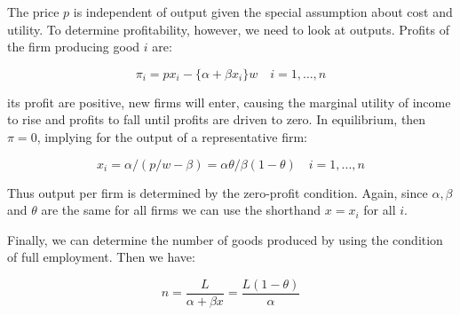 The price $p$ is independent of output given the special assumption about cost and utility. To determine profitability, however, we need to look at outputs. Profits of the firm producing good $i$ are:

\begin{equation}
    \pi_i = p x_i - \{\alpha + \beta x_i\}w \quad i = 1, \ldots, n
\end{equation}

its profit are positive, new firms will enter, causing the marginal utility of income to rise and profits to fall until profits are driven to zero. In equilibrium, then $\pi = 0$, implying for the output of a representative firm:

\begin{equation}
    x_i = \alpha / (p / w - \beta) = \alpha \theta / \beta (1 - \theta) \quad i = 1, \ldots, n
\end{equation}

Thus output per firm is determined by the zero-profit condition. Again, since $\alpha, \beta$ and $\theta$ are the same for all firms we can use the shorthand $x = x_i$ for all $i$.

Finally, we can determine the number of goods produced by using the condition of full employment. Then we have:

\begin{equation}
    n = \frac{L}{\alpha + \beta x} = \frac{L(1 - \theta)}{\alpha}
\end{equation}